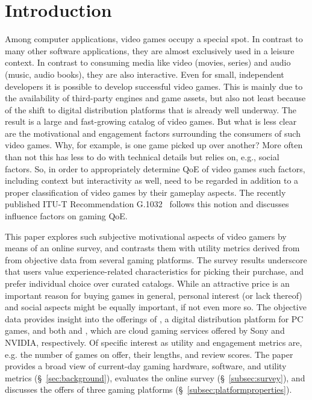 
\section{Introduction}

Among computer applications, video games occupy a special spot.
In contrast to many other software applications, they are almost
exclusively used in a leisure context.
In contrast to consuming media like video (movies, series) and
audio (music, audio books), they are also interactive.
Even for small, independent developers it is possible to develop successful video games. This is mainly due to the availability of third-party engines and game assets, but also not least because of the shift to digital distribution platforms that is already well underway. The result is a large and fast-growing catalog of video games.
But what is less clear are the motivational and engagement factors surrounding the consumers of such video games. Why, for example, is one game picked up over another? More often than not this has less to do with technical details but relies on, e.g., social factors.
So, in order to appropriately determine \gls{QoE} of video games such factors, including context but interactivity as well, need to be regarded in addition to a proper classification of video games by their gameplay aspects.
The recently published \acrshort{ITU-T} Recommendation
G.1032~\cite{itutg1032} follows this notion and discusses influence
factors on gaming \gls{QoE}.

This paper explores such subjective motivational aspects of video gamers
by means of an online survey, and contrasts them with utility
metrics derived from from objective data from several gaming platforms.
The survey results underscore that users value experience-related
characteristics for picking their purchase, and prefer individual choice
over curated catalogs. While an attractive price is an important
reason for buying games in general, personal interest (or lack thereof) and social aspects might be equally important, if not even more so.
The objective data provides insight into the offerings of \steam, a digital distribution platform for PC games, and both \psnow and \gfnow, which are cloud gaming services offered by Sony and NVIDIA, respectively.
Of specific interest as utility and engagement metrics are, e.g. the number
of games on offer, their lengths, and review scores.
The paper provides a broad view of current-day gaming hardware,
software, and utility metrics (§~\ref{sec:background}),
evaluates the online survey (§~\ref{subsec:survey}), and
discusses the offers of three gaming platforms
(§~\ref{subsec:platformproperties}).
